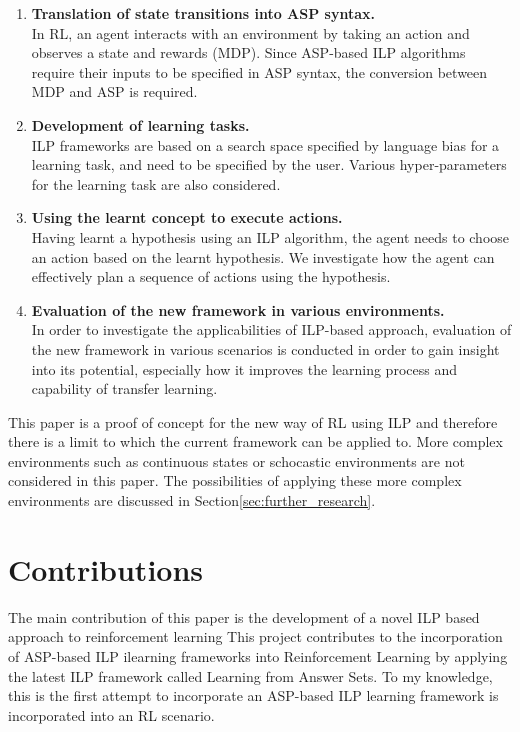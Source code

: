 \newcommand\litem[1]{\item{\bfseries #1.\\}}
\begin{enumerate}
\litem{Translation of state transitions into ASP syntax} 
In RL, an agent interacts with an environment by taking an action and observes a state and rewards (MDP). 
Since ASP-based ILP algorithms require their inputs to be specified in ASP syntax, the conversion between MDP and ASP is required.
\litem{Development of learning tasks} ILP frameworks are based on a search space specified by language bias for a learning task, and need to be specified by the user. 
Various hyper-parameters for the learning task are also considered.
\litem{Using the learnt concept to execute actions}
Having learnt a hypothesis using an ILP algorithm, the agent needs to choose an action based on the learnt hypothesis.
We investigate how the agent can effectively plan a sequence of actions using the hypothesis.
\litem{Evaluation of the new framework in various environments}
In order to investigate the applicabilities of ILP-based approach, evaluation of the new framework in various scenarios is conducted in order to gain
insight into its potential, especially how it improves the learning process and capability of transfer learning.
\end{enumerate}

This paper is a proof of concept for the new way of RL using ILP and therefore there is a limit to which the current framework can be applied to.
More complex environments such as continuous states or schocastic environments are not considered in this paper. 
The possibilities of applying these more complex environments are discussed in Section\ref{sec:further_research}.

\section{Contributions}
\label{contributions}
The main contribution of this paper is the development of a novel ILP based approach to reinforcement learning 
This project contributes to the incorporation of ASP-based ILP ilearning frameworks into Reinforcement Learning by applying the latest ILP framework called Learning from Answer Sets. 
To my knowledge, this is the first attempt to incorporate an ASP-based ILP learning framework is incorporated into an RL scenario.

